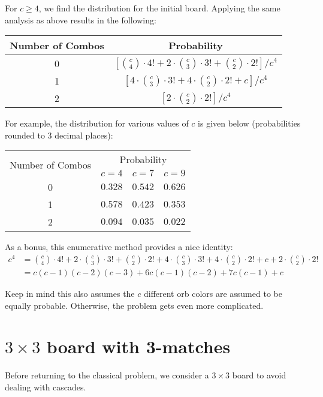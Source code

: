 \documentclass[12pt]{article}
\theoremstyle{definition}
\begin{document}
For $c\geq 4$, we find the distribution for the initial board. Applying the same analysis as above results in the following:
\begin{center}
    \renewcommand{\arraystretch}{2}
    \begin{tabular}{|c|c|}
        \hline
        Number of Combos & Probability \\
        \hline\hline
        0 & $\left[\binom{c}{4}\cdot 4! + 2 \cdot \binom{c}{3}\cdot 3! + \binom{c}{2} \cdot 2!\right]/c^4$\\
        \hline
        1 & $\left[4\cdot \binom{c}{3}\cdot 3!+4\cdot\binom{c}{2}\cdot 2! + c\right]/c^4$ \\
        \hline
        2 & $\left[2\cdot\binom{c}{2}\cdot 2!\right]/c^4$\\
        \hline
    \end{tabular}
    \renewcommand{\arraystretch}{2}
\end{center}
For example, the distribution for various values of $c$ is given below (probabilities rounded to 3 decimal places):
\begin{center}
    \begin{tabular}{|c|c|c|c|}
        \hline
        \multirow{2}{9em}{Number of Combos} & \multicolumn{3}{|c|}{Probability} \\
        \cline{2-4}
         & $c=4$ & $c=7$ & $c=9$\\
        \hline\hline
        0 & $0.328$ & $0.542$ & $0.626$\\
        \hline
        1 & $0.578$ & $0.423$ & $0.353$\\
        \hline
        2 & $0.094$ & $0.035$ & $0.022$\\
        \hline
    \end{tabular}
    \quad
\end{center}
As a bonus, this enumerative method provides a nice identity:
\begin{align*}
    c^4 &= \binom{c}{4}\cdot 4! + 2 \cdot \binom{c}{3}\cdot 3! + \binom{c}{2} \cdot 2! + 4\cdot \binom{c}{3}\cdot 3!+4\cdot\binom{c}{2}\cdot 2! + c + 2\cdot\binom{c}{2}\cdot 2!\\
    &= c(c-1)(c-2)(c-3)+6c(c-1)(c-2)+7c(c-1)+c
\end{align*}

Keep in mind this also assumes the $c$ different orb colors are assumed to be equally probable. Otherwise, the problem gets even more complicated.

\section[3x3 board with 3-matches]{$3\times 3$ board with 3-matches}
Before returning to the classical problem, we consider a $3\times 3$ board to avoid dealing with cascades.
\end{document}
